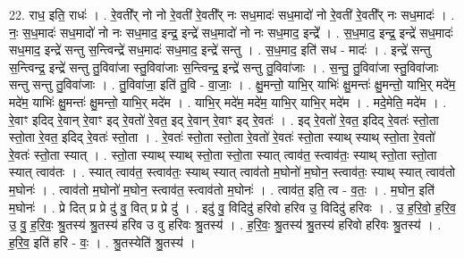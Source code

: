 \documentclass[17pt]{extarticle}
\begin{document}
22. राध॒ इति॒ राधः॑ । . रे॒वती᳚र् नो नो रे॒वती॑ रे॒वती᳚र् नः सध॒मादः॑ सध॒मादो॑ नो रे॒वती॑ रे॒वती᳚र् नः सध॒मादः॑ । . नः॒ स॒ध॒मादः॑ सध॒मादो॑ नो नः सध॒माद॒ इन्द्र॒ इन्द्रे॑ सध॒मादो॑ नो नः सध॒माद॒ इन्द्रे᳚ । . स॒ध॒माद॒ इन्द्र॒ इन्द्रे॑ सध॒मादः॑ सध॒माद॒ इन्द्रे॑ सन्तु स॒न्त्विन्द्रे॑ सध॒मादः॑ सध॒माद॒ इन्द्रे॑ सन्तु । . स॒ध॒माद॒ इति॑ सध - मादः॑ । . इन्द्रे॑ सन्तु स॒न्त्विन्द्र॒ इन्द्रे॑ सन्तु तु॒विवा॑जा स्तु॒विवा॑जाः स॒न्त्विन्द्र॒ इन्द्रे॑ सन्तु तु॒विवा॑जाः । . स॒न्तु॒ तु॒विवा॑जा स्तु॒विवा॑जाः सन्तु सन्तु तु॒विवा॑जाः । . तु॒विवा॑जा॒ इति॑ तु॒वि - वा॒जाः॒ । . क्षु॒मन्तो॒ याभि॒र् याभिः॑ क्षु॒मन्तः॑ क्षु॒मन्तो॒ याभि॒र् मदे॑म॒ मदे॑म॒ याभिः॑ क्षु॒मन्तः॑ क्षु॒मन्तो॒ याभि॒र् मदे॑म । . याभि॒र् मदे॑म॒ मदे॑म॒ याभि॒र् याभि॒र् मदे॑म । . मदे॒मेति॒ मदे॑म । . रे॒वाꣳ इदिद् रे॒वान् रे॒वाꣳ इद् रे॒वतो॑ रे॒वत॒ इद् रे॒वान् रे॒वाꣳ इद् रे॒वतः॑ । . इद् रे॒वतो॑ रे॒वत॒ इदिद् रे॒वतः॑ स्तो॒ता स्तो॒ता रे॒वत॒ इदिद् रे॒वतः॑ स्तो॒ता । . रे॒वतः॑ स्तो॒ता स्तो॒ता रे॒वतो॑ रे॒वतः॑ स्तो॒ता स्याथ् स्याथ् स्तो॒ता रे॒वतो॑ रे॒वतः॑ स्तो॒ता स्यात् । . स्तो॒ता स्याथ् स्याथ् स्तो॒ता स्तो॒ता स्यात् त्वाव॑त॒ स्त्वाव॑तः॒ स्याथ् स्तो॒ता स्तो॒ता स्यात् त्वाव॑तः । . स्यात् त्वाव॑त॒ स्त्वाव॑तः॒ स्याथ् स्यात् त्वाव॑तो म॒घोनो॑ म॒घोन॒ स्त्वाव॑तः॒ स्याथ् स्यात् त्वाव॑तो म॒घोनः॑ । . त्वाव॑तो म॒घोनो॑ म॒घोन॒ स्त्वाव॑त॒ स्त्वाव॑तो म॒घोनः॑ । . त्वाव॑त॒ इति॒ त्व - व॒तः॒ । . म॒घोन॒ इति॑ म॒घोनः॑ । . प्रे दित् प्र प्रे दु॑ वु॒ वित् प्र प्रे दु॑ । . इदु॑ वु॒ विदिदु॑ हरिवो हरिव उ॒ विदिदु॑ हरिवः । . उ॒ ह॒रि॒वो॒ ह॒रि॒व॒ उ॒ वु॒ ह॒रि॒वः॒ श्रु॒तस्य॑ श्रु॒तस्य॑ हरिव उ वु हरिवः श्रु॒तस्य॑ । . ह॒रि॒वः॒ श्रु॒तस्य॑ श्रु॒तस्य॑ हरिवो हरिवः श्रु॒तस्य॑ । . ह॒रि॒व॒ इति॑ हरि - वः॒ । . श्रु॒तस्येति॑ श्रु॒तस्य॑ । \newline
\pagebreak
\end{document}
